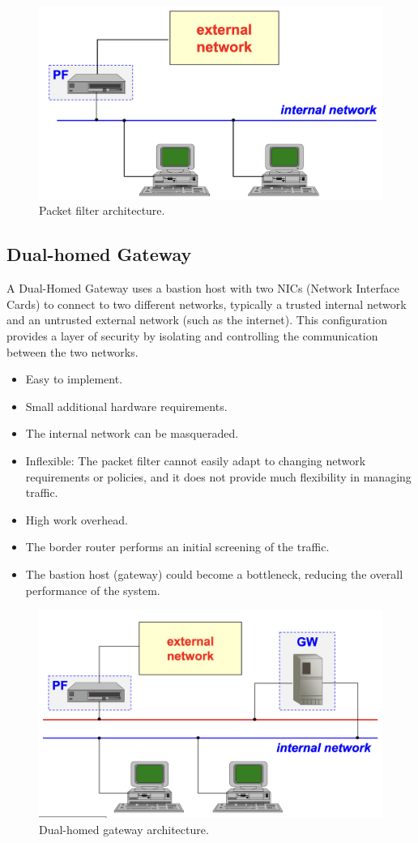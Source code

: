 \begin{figure}[H]
    \centering
    \includegraphics[width=0.5\linewidth]{Images/Firewalling/packet_filter.png}
    \caption{Packet filter architecture.}
\end{figure}

\subsection{Dual-homed Gateway}
A Dual-Homed Gateway uses a bastion host with two NICs (Network Interface Cards) to connect to two different networks, typically a trusted internal network and an untrusted external network (such as the internet). This configuration provides a layer of security by isolating and controlling the communication between the two networks.

\begin{itemize}
    \item Easy to implement.
    \item Small additional hardware requirements.
    \item The internal network can be masqueraded.
    \item Inflexible: The packet filter cannot easily adapt to changing network requirements or policies, and it does not provide much flexibility in managing traffic.
    \item High work overhead.
    \item The border router performs an initial screening of the traffic.
    \item The bastion host (gateway) could become a bottleneck, reducing the overall performance of the system.
\end{itemize}

\begin{figure}[H]
    \centering
    \includegraphics[width=0.5\linewidth]{Images/Firewalling/dual_homed_gateway.png}
    \caption{Dual-homed gateway architecture.}
\end{figure}

